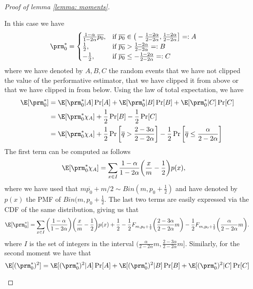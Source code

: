 \begin{proof}[Proof of lemma \ref{lemma: moments}]
\begin{enumerate}[(i)]
In this case we have 
\begin{align*}
\prm^\ast_0 &= 
\begin{cases}
\frac{1 - \alpha}{1-2\alpha} \overline{p_0}, & \text{if } \overline{p_0} \in \big(- \frac{1-2\alpha}{2 - 2\alpha}, \frac{1-2\alpha}{2 - 2\alpha} \big] =: A\\
\frac12 , & \text{if } \overline{p_0} > \frac{1-2\alpha}{2 - 2\alpha} =: B\\
-\frac12 , & \text{if } \overline{p_0} \le - \frac{1-2\alpha}{2 - 2\alpha} =: C
\end{cases}
\end{align*}
where we have denoted by $A,B,C$ the random events that we have not clipped the value of the performative estimator, that we have clipped it from above or that we have clipped in from below. Using the law of total expectation, we have 
\begin{align*}
\E[\prm^\ast_0] &= \E[\prm^\ast_0 | A] \Pr[A] + \E[\prm^\ast_0 | B] \Pr[B] + \E[\prm^\ast_0 | C] \Pr[C]\\
&= \E[\prm^\ast_0 \chi_{A}] + \frac12 \Pr[B] - \frac12 \Pr[C]\\
&= \E[\prm^\ast_0 \chi_{A}] + \frac12 \Pr\bigg[\overline{q} > \frac{2-3\alpha}{2-2\alpha}\bigg] - \frac12 \Pr\bigg[\overline{q} \le \frac{\alpha}{2-2\alpha}\bigg]
\end{align*}
The first term can be computed as follows
\begin{align*}
\E[\prm^\ast_0 \chi_{A}] &= \sum_{x \in I} \frac{1 - \alpha}{1-2\alpha} \bigg( \frac{x}{m} - \frac12 \bigg) p(x),
\end{align*}
where we have used that $m\overline{p_0} + m/2 \sim Bin(m, p_0 + \frac12)$ and have denoted by $p(x)$ the PMF of $Bin(m, p_0 + \frac12$. The last two terms are easily expressed via the CDF of the same distribution, giving us that 
\begin{align*}
\E[\prm^\ast_0] = \sum_{x \in I} \bigg(\frac{1 - \alpha}{1-2\alpha}\bigg) \bigg(\frac{x}{m} - \frac12 \bigg) p(x) 
+ \frac12  - \frac12 F_{m, p_0 + \frac12}\bigg( \frac{2 - 3\alpha}{2-2\alpha}m \bigg)
 - \frac12 F_{m, p_0 + \frac12}\bigg( \frac{\alpha }{2-2\alpha}m\bigg).
\end{align*}
where $I$ is the set of integers in the interval $( \frac{\alpha }{2 - 2\alpha}m, \frac{2-3\alpha}{2 - 2\alpha} m]$. Similarly, for the second moment we have that 
\begin{align*}
\E[(\prm^\ast_0)^2] &= \E[(\prm^\ast_0)^2 | A] \Pr[A] + \E[(\prm^\ast_0)^2 | B] \Pr[B] + \E[(\prm^\ast_0)^2 | C] \Pr[C]\\

\end{align*}
\end{enumerate}
\end{proof}
